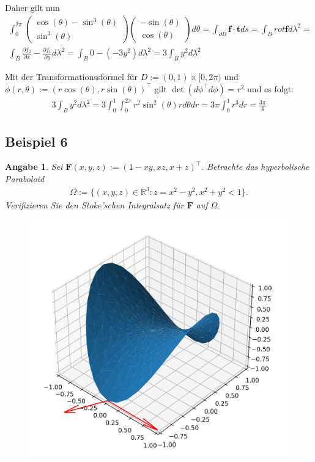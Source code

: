 \documentclass[]{article}
\newtheorem*{angabe*}{Angabe}
\begin{document}
\begin{enumerate}[label*=(\roman*)]
	Daher gilt nun
	\begin{align*}
		\int_{0}^{2\pi} \begin{pmatrix} \cos(\theta)-\sin^3(\theta)\\ \sin^3(\theta) \end{pmatrix} \begin{pmatrix} -\sin(\theta)\\ \cos(\theta) \end{pmatrix} d\theta = \int_{\partial B} \bm{f} \cdot \bm{t} ds = \int_B rot\bm{f} d\lambda^2 = \\
		\int_B \frac{\partial f_2}{\partial x} - \frac{\partial f_1}{\partial y} d\lambda^2 =		\int_B 0 - (-3y^2) d\lambda^2 = 3 \int_B y^2 d\lambda^2
	\end{align*}

	Mit der Transformationssformel für $D:=(0,1)\times[0,2\pi)$ und $\phi(r,\theta):=(r\cos(\theta), r\sin(\theta))^\top$ gilt $\det(d\phi^\top d\phi) = r^2$ und es folgt:
	\begin{align*}
		3 \int_B y^2 d\lambda^2 = 3 \int_{0}^{1} \int_{0}^{2\pi} r^2 \sin^2(\theta) r d\theta dr = 3\pi \int_{0}^{1} r^3 dr = \frac{3\pi}{4}
	\end{align*}
\end{enumerate}
\newpage

\subsection*{Beispiel 6}
\begin{angabe*}
	Sei $\bm{F}(x,y,z):=(1-xy, xz, x+z)^\top$. Betrachte das hyperbolische Paraboloid
	\begin{align*}
		\Omega := \{(x,y,z) \in \mathbb{R}^3: z = x^2-y^2, x^2+y^2 < 1\}.
	\end{align*}
	Verifizieren Sie den Stoke'schen Integralsatz für $\bm{F}$ auf $\Omega$.
\end{angabe*}

\begin{figure}[h!]
	\center
	\includegraphics[width=0.5\columnwidth]{bsp_6.png}
\end{figure}
\end{document}
